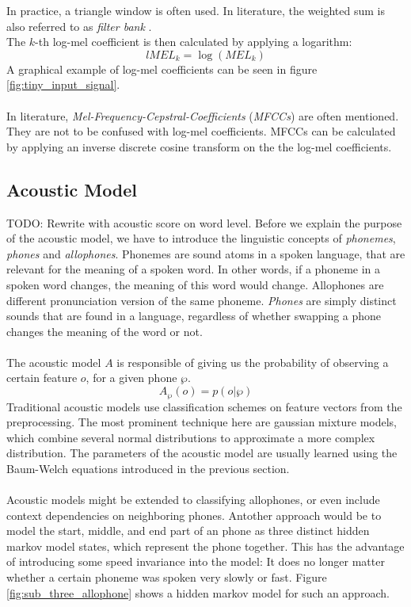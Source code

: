 In practice, a triangle window is often used. In literature, the weighted sum is also referred to as \textit{filter bank} \cite{zhan1997vocal}. \\
The $k$-th log-mel coefficient is then calculated by applying a logarithm:
\[
lMEL_k = \log(MEL_k) 
\]
A graphical example of log-mel coefficients can be seen in figure \ref{fig:tiny_input_signal}.
\\ \\
In literature, \textit{Mel-Frequency-Cepstral-Coefficients} (\textit{MFCCs}) are often mentioned. They are not to be confused with log-mel coefficients. MFCCs can be calculated by applying an inverse discrete cosine transform on the the log-mel coefficients.


\subsection{Acoustic Model}
\label{sec:acoustic_model}
TODO: Rewrite with acoustic score on word level. 
Before we explain the purpose of the acoustic model, we have to introduce the linguistic concepts of \textit{phonemes}, \textit{phones} and \textit{allophones}. Phonemes are sound atoms in a spoken language, that are relevant for the meaning of a spoken word. In other words, if a phoneme in a spoken word changes, the meaning of this word would change. Allophones are different pronunciation version of the same phoneme. \textit{Phones} are simply distinct sounds that are found in a language, regardless of whether swapping a phone changes the meaning of the word or not. \\ \\
The acoustic model $A$ is responsible of giving us the probability of observing a certain feature $o$, for a given phone $\wp$. 
\[
	A_\wp(o) = p(o|\wp)
\]
Traditional acoustic models use classification schemes on feature vectors from the preprocessing. The most prominent technique here are gaussian mixture models, which combine several normal distributions to approximate a more complex distribution. The parameters of the acoustic model are usually learned using the Baum-Welch equations introduced in the previous section. \\ \\
Acoustic models might be extended to classifying allophones, or even include context dependencies on neighboring phones. Antother approach would be to model the start, middle, and end part of an phone as three distinct hidden markov model states, which represent the phone together. This has the advantage of introducing some speed invariance into the model: It does no longer matter whether a certain phoneme was spoken very slowly or fast. Figure \ref{fig:sub_three_allophone} shows a hidden markov model for such an approach. 

